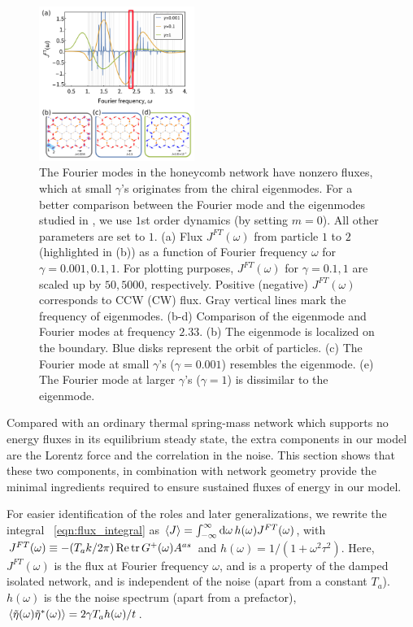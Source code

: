 \documentclass[
 preprint,
 preprintnumbers,
 amsmath,amssymb,
 aps,
 pre,
 longbibliography,
 superscriptaddress,
 10pt, twocolumn
]{revtex4-1}
\begin{document}
\begin{figure}[ht]
	\centering
	\includegraphics[width=0.45\textwidth]{2_Fourier_modes.pdf}
    \caption{The Fourier modes in the honeycomb network have nonzero fluxes, which at small $\gamma$'s originates from the chiral eigenmodes. For a better comparison between the Fourier mode and the eigenmodes studied in \cite{Nash2015TopologicalMechanics}, we use $1$st order dynamics (by setting $m=0$). All other parameters are set to $1$.
    (a) Flux $J^{FT}(\omega)$ from particle $1$ to $2$ (highlighted in (b)) as a function of Fourier frequency $\omega$ for $\gamma=0.001,0.1,1$. For plotting purposes, $J^{FT}(\omega)$ for $\gamma=0.1,1$ are scaled up by $50,5000$, respectively. Positive (negative) $J^{FT}(\omega)$ corresponds to CCW (CW) flux. Gray vertical lines mark the frequency of eigenmodes.
    (b-d) Comparison of the eigenmode and Fourier modes at frequency $2.33$.
    (b) The eigenmode is localized on the boundary. Blue disks represent the orbit of particles.
    (c) The Fourier mode at small $\gamma$'s ($\gamma=0.001$) resembles the eigenmode.
    (e) The Fourier mode at larger $\gamma$'s ($\gamma=1$) is dissimilar to the eigenmode.
    }
    \label{fig:Fourier_modes}
\end{figure}

Compared with an ordinary thermal spring-mass network which supports no energy fluxes in its equilibrium steady state, the extra components in our model are the Lorentz force and the correlation in the noise.
This section shows that these two components, in combination with network geometry provide the minimal ingredients required to ensure sustained fluxes of energy in our model. 

For easier identification of the roles and later generalizations, we rewrite the integral \eqnname~\eqref{eqn:flux_integral} as $\expval{J} = \int_{-\infty}^\infty \dd{\omega} h(\omega) J^{FT}(\omega)$, with $J^{FT}(\omega) \equiv -(T_a k/2\pi) \Re \tr G^+(\omega)A^{as}$ and $h(\omega)=1/(1+\omega^2\tau^2)$. Here, $J^{FT}(\omega)$ is the flux at Fourier frequency $\omega$, and is a property of the damped isolated network, and is independent of the noise (apart from a constant $T_a$).
$h(\omega)$ is the the noise spectrum (apart from a prefactor), $\expval{\tilde{\eta}(\omega)\tilde{\eta}^*(\omega)} = 2\gamma T_a h(\omega) / t$.
\end{document}
